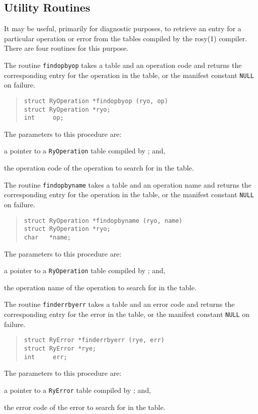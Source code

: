 \subsection	{Utility Routines}
It may be useful,
primarily for diagnostic purposes,
to retrieve an entry for a particular operation or error from the tables
compiled by the \man rosy(1) compiler.
There are four routines for this purpose.

The routine \verb"findopbyop" takes a table and an operation code and returns
the corresponding entry for the operation in the table,
or the manifest constant \verb"NULL" on failure.
\begin{quote}\small\begin{verbatim}
struct RyOperation *findopbyop (ryo, op)
struct RyOperation *ryo;
int     op;
\end{verbatim}\end{quote}
The parameters to this procedure are:
\begin{describe}
\item[\verb"ryo":] a pointer to a \verb"RyOperation" table compiled by
;
and,

\item[\verb"op":] the operation code of the operation to search for in the
table.
\end{describe}

The routine \verb"findopbyname" takes a table and an operation name and returns
the corresponding entry for the operation in the table,
or the manifest constant \verb"NULL" on failure.
\begin{quote}\small\begin{verbatim}
struct RyOperation *findopbyname (ryo, name)
struct RyOperation *ryo;
char   *name;
\end{verbatim}\end{quote}
The parameters to this procedure are:
\begin{describe}
\item[\verb"ryo":] a pointer to a \verb"RyOperation" table compiled by
;
and,

\item[\verb"name":] the operation name of the operation to search for in the
table.
\end{describe}

The routine \verb"finderrbyerr" takes a table and an error code and returns
the corresponding entry for the error in the table,
or the manifest constant \verb"NULL" on failure.
\begin{quote}\small\begin{verbatim}
struct RyError *finderrbyerr (rye, err)
struct RyError *rye;
int     err;
\end{verbatim}\end{quote}
The parameters to this procedure are:
\begin{describe}
\item[\verb"rye":] a pointer to a \verb"RyError" table compiled by
;
and,

\item[\verb"err":] the error code of the error to search for in the
table.
\end{describe}

